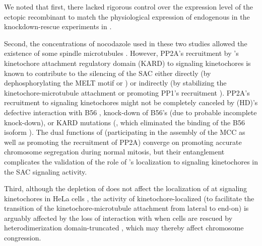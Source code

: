 We noted that first, there lacked rigorous control over the expression level of the ectopic recombinant  to match the physiological expression of endogenous  in the knockdown-rescue experiments in \cite{BubBiochem, BubR1TwoPools}.

Second, the concentrations of nocodazole used in these two studies allowed the existence of some spindle microtubules \cite{RZZ-MAD1vsBUB1-MAD1_2015}. However, PP2A's recruitment by 's kinetochore attachment regulatory domain (KARD) to signaling kinetochores is known to contribute to the silencing of the SAC either directly (by dephosphorylating the MELT motif \cite{PP2ADephosphorylatesKNL1} or  \cite{PP2ADephosphorylatesBUB1}) or indirectly (by stabilizing the kinetochore-microtubule attachment \cite{BUBR1_KT-MT, Suijkerbuijk2012, BUBR1-L669A+I672A, PP2A-B56-BUBR1ChromosomeCongression_Xu2013} or promoting PP1's recruitment \cite{PP2A-B56}). PP2A's recruitment to signaling kinetochores might not be completely canceled by (\textDelta{}HD)'s defective interaction with B56 \cite{BubBiochem}, knock-down of B56's (due to probable incomplete knock-down), or KARD mutations (\cite{BubR1TwoPools}, which eliminated the binding of the B56\textalpha{} isoform \cite{BUBR1-L669A+I672A}). The dual functions of  (participating in the assembly of the MCC as well as promoting the recruitment of PP2A) converge on promoting accurate chromosome segregation during normal mitosis, but their entanglement complicates the validation of the role of 's localization to signaling kinetochores in the SAC signaling activity.

Third, although the depletion of  does not affect the localization of  at signaling kinetochores in HeLa cells \cite{CENPELocalization-BUBR1}, the activity of kinetochore-localized  (to facilitate the transition of the kinetochore-microtubule attachment from lateral to end-on) is arguably affected by the loss of interaction with  \cite{CENPEActivity-BUBR1} when cells are rescued by heterodimerization domain-truncated , which may thereby affect chromosome congression. %

